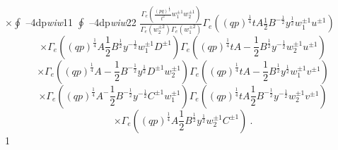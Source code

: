 \documentclass[a4paper,12pt]{article}
\begin{document}
$\displaystyle \times\oint$ --4dp{\it wiw}11 $\displaystyle \oint$ --4dp{\it wiw}22 $\displaystyle \frac{\Gamma_{e}(\frac{(pq)^{\frac{1}{2}}}{t^{2}}w_{1}^{\pm 1}w_{2}^{\pm 1})}{\Gamma_{e}(w_{2}^{\pm 2})\Gamma_{e}(w_{1}^{\pm 2})}\Gamma_{e}((qp)^{\frac{1}{4}}tA\frac{1}{2}B^{-\frac{1}{2}}y^{\frac{1}{2}}w_{1}^{\pm 1}u^{\pm 1})$
$$
\times\Gamma_{e}((qp)^{\frac{1}{4}}A\frac{1}{2}B^{\frac{1}{2}}y^{-\frac{1}{2}}w_{1}^{\pm 1}D^{\pm 1})\Gamma_{e}((qp)^{\frac{1}{4}}tA-\frac{1}{2}B^{\frac{1}{2}}y^{-\frac{1}{2}}w_{2}^{\pm 1}u^{\pm 1})
$$
$$
\times\Gamma_{e}((qp)^{\frac{1}{4}}A-\frac{1}{2}B^{-\frac{1}{2}}y^{\frac{1}{2}}D^{\pm 1}w_{2}^{\pm 1})\Gamma_{e}((qp)^{\frac{1}{4}}tA-\frac{1}{2}B^{\frac{1}{2}}y^{\frac{1}{2}}w_{1}^{\pm 1}v^{\pm 1})
$$
$$
\times\Gamma_{e}((qp)^{\frac{1}{4}}A^{-}\frac{1}{2}B^{-\frac{1}{2}}y^{-\frac{1}{2}}C^{\pm 1}w_{1}^{\pm 1})\Gamma_{e}((qp)^{\frac{1}{4}}tA\frac{1}{2}B^{-\frac{1}{2}}y^{-\frac{1}{2}}w_{2}^{\pm 1}v^{\pm 1})
$$
$$
\times\Gamma_{e}((qp)^{\frac{1}{4}}A\frac{1}{2}B^{\frac{1}{2}}y^{\frac{1}{2}}w_{2}^{\pm 1}C^{\pm 1})\ .
$$
1
\end{document}
